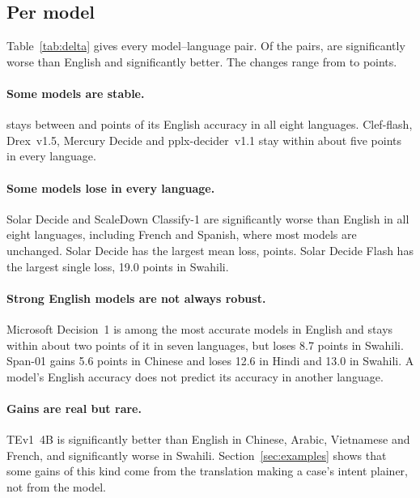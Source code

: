 \subsection{Per model}



Table~\ref{tab:delta} gives every model--language pair. Of the \MLnPairs{}
pairs, \MLsigNeg{} are significantly worse than English and \MLsigPos{}
significantly better. The changes range from \MLdeltaMin{} to \MLdeltaMax{}
points.

\paragraph{Some models are stable.} \MLstableModel{} stays between
\MLstableMin{} and \MLstableMax{} points of its English accuracy in all eight
languages. Clef-flash, Drex~v1.5, Mercury Decide and pplx-decider~v1.1 stay
within about five points in every language.

\paragraph{Some models lose in every language.} Solar Decide and ScaleDown
Classify-1 are significantly worse than English in all eight languages,
including French and Spanish, where most models are unchanged. Solar Decide has
the largest mean loss, \MLworstMean{} points. Solar Decide Flash has the largest
single loss, 19.0 points in Swahili.

\paragraph{Strong English models are not always robust.} Microsoft Decision~1
is among the most accurate models in English and stays within about two points
of it in seven languages, but loses 8.7 points in Swahili. Span-01 gains 5.6
points in Chinese and loses 12.6 in Hindi and 13.0 in Swahili. A model's
English accuracy does not predict its accuracy in another language.

\paragraph{Gains are real but rare.} TEv1~4B is significantly better than
English in Chinese, Arabic, Vietnamese and French, and significantly worse in
Swahili. Section~\ref{sec:examples} shows that some gains of this kind come
from the translation making a case's intent plainer, not from the model.

